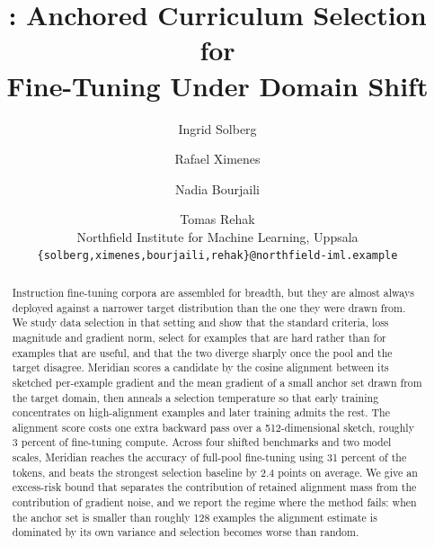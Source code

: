 \documentclass[11pt]{article}
\title{\bfseries \method: Anchored Curriculum Selection for\\
Fine-Tuning Under Domain Shift}
\author{
  Ingrid Solberg \and Rafael Ximenes \and Nadia Bourjaili \and Tomas Rehak\\
  \normalsize Northfield Institute for Machine Learning, Uppsala\\
  \normalsize \texttt{\{solberg,ximenes,bourjaili,rehak\}@northfield-iml.example}
}
\date{}
\newcommand{\method}{Meridian}
\begin{document}
\maketitle

\begin{abstract}
Instruction fine-tuning corpora are assembled for breadth, but they are almost
always deployed against a narrower target distribution than the one they were
drawn from. We study data selection in that setting and show that the standard
criteria, loss magnitude and gradient norm, select for examples that are hard
rather than for examples that are useful, and that the two diverge sharply once
the pool and the target disagree. \method{} scores a candidate by the cosine
alignment between its sketched per-example gradient and the mean gradient of a
small anchor set drawn from the target domain, then anneals a selection
temperature so that early training concentrates on high-alignment examples and
later training admits the rest. The alignment score costs one extra backward
pass over a 512-dimensional sketch, roughly 3 percent of fine-tuning compute.
Across four shifted benchmarks and two model scales, \method{} reaches the
accuracy of full-pool fine-tuning using 31 percent of the tokens, and beats the
strongest selection baseline by 2.4 points on average. We give an excess-risk
bound that separates the contribution of retained alignment mass from the
contribution of gradient noise, and we report the regime where the method
fails: when the anchor set is smaller than roughly 128 examples the alignment
estimate is dominated by its own variance and selection becomes worse than
random.
\end{abstract}










\end{document}
